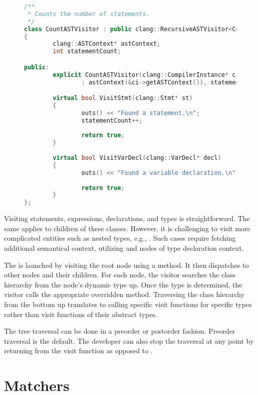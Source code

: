 \begin{figure}[ht]\centering
\begin{lstlisting}[caption=CountASTVisitor., language=C++, 
label={lst:countvisitor}]
/**
 * Counts the number of statements.
 */
class CountASTVisitor : public clang::RecursiveASTVisitor<CountASTVisitor>
{
        clang::ASTContext* astContext;
        int statementCount;

public:
        explicit CountASTVisitor(clang::CompilerInstance* ci)
                : astContext(&ci->getASTContext()), statementCount(0) { }

        virtual bool VisitStmt(clang::Stmt* st)
        {
                outs() << "Found a statement.\n";
				statementCount++;
				
                return true;
        }
		
		virtual bool VisitVarDecl(clang::VarDecl* decl)
        {
                outs() << "Found a variable declaration.\n";
				
                return true;
        }
};
\end{lstlisting}
\end{figure}

Visiting statements, expressions, declarations, 
and types is straightforward. 
The same applies to children of these classes. 
However, it is challenging to visit more complicated entities 
such as nested types, e.g., . 
Such cases require fetching additional semantical context, 
utilizing  and nodes of type declaration context.


The  is launched by visiting the root node using 
a  method. 
It then dispatches to other nodes and their children. 
For each node, the visitor searches the class hierarchy from 
the node's dynamic type up. 
Once the type is determined, the visitor calls the appropriate 
overridden  method. 
Traversing the class hierarchy from the bottom up 
translates to calling specific visit functions for specific types 
rather than visit functions of their abstract types.

The tree traversal can be done in a preorder or postorder fashion. 
Preorder traversal is the default. The developer can also stop
the traversal at any point by returning  from
the visit function as opposed to .

\section{Matchers}

